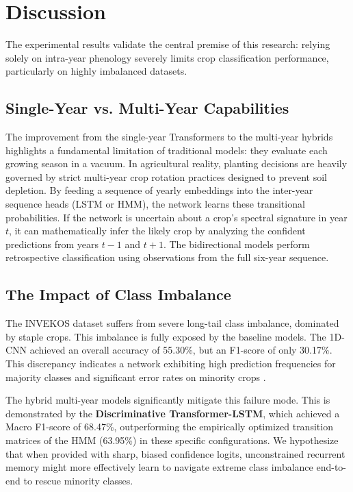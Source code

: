\section{Discussion}
\label{sec:discussion}

The experimental results validate the central premise of this research: relying solely on intra-year phenology severely
limits crop classification performance, particularly on highly imbalanced datasets.

\subsection{Single-Year vs. Multi-Year Capabilities}
\label{subsec:single_vs_multi_year}

The improvement from the single-year Transformers to the multi-year hybrids highlights a fundamental limitation
of traditional models: they evaluate each growing season in a vacuum.
In agricultural reality, planting decisions are heavily governed by strict multi-year crop rotation practices designed to prevent soil depletion.
By feeding a sequence of yearly embeddings into the inter-year sequence heads (LSTM or HMM), the network learns these transitional probabilities.
If the network is uncertain about a crop's spectral signature in year $t$, it can mathematically infer the likely crop by analyzing the confident
predictions from years $t-1$ and $t+1$. 
The bidirectional models perform retrospective classification using observations from the full six-year sequence.

\subsection{The Impact of Class Imbalance}
\label{subsec:class_imbalance}

The INVEKOS dataset suffers from severe long-tail class imbalance, dominated by staple crops. This imbalance is fully exposed by the baseline models.
The 1D-CNN achieved an overall accuracy of 55.30\%, but an F1-score of only 30.17\%.
This discrepancy indicates a network exhibiting high prediction frequencies for majority classes and significant error rates on minority crops \cite{johnson2019survey}.

The hybrid multi-year models significantly mitigate this failure mode.
This is demonstrated by the \textbf{Discriminative Transformer-LSTM}, which achieved a Macro F1-score of 68.47\%,
outperforming the empirically optimized transition matrices of the HMM (63.95\%) in these specific configurations.
We hypothesize that when provided with sharp, biased confidence logits, unconstrained recurrent memory might more effectively
learn to navigate extreme class imbalance end-to-end to rescue minority classes.

